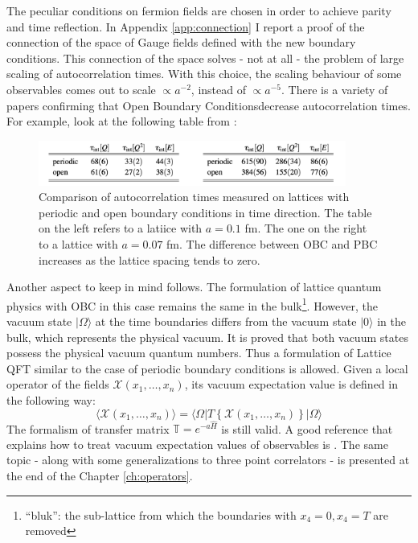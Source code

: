 \documentclass[english, LaM, oneside, noexaminfo]{sapthesis}
\newcommand{\la}{\langle}
\newcommand{\ra}{\rangle}
\newcommand{\obc}{Open Boundary Conditions}
\begin{document}
The peculiar conditions on fermion fields are chosen in order to achieve parity and time reflection.
In Appendix \ref{app:connection} I report a proof of the connection of the space of Gauge fields defined with the new boundary conditions.
This connection of the space solves - not at all - the problem of large scaling of autocorrelation times.
With this choice, the scaling behaviour of some observables comes out to scale $\propto a^{-2}$, instead of $\propto a^{-5}$.
There is a variety of papers confirming that \obc\space decrease autocorrelation times.
For example, look at the following table from \cite{Topology-WilsonFlow-HMC}:
\begin{figure}[h!]
    \centering
    \includegraphics[width=0.9\textwidth]{imgs-MSc-thesis/autocorrelation.png}
    \caption{Comparison of autocorrelation times measured on lattices with periodic and open boundary conditions in time direction.
    The table on the left refers to a latiice with $a=0.1$ fm. The one on the right to a lattice with $a=0.07$ fm. The difference between OBC and PBC increases as the lattice spacing tends to zero. \cite{Topology-WilsonFlow-HMC}}
    \label{tab:autocorrelation-times}
\end{figure}
\newline
Another aspect to keep in mind follows.
The formulation of lattice quantum physics with OBC in this case remains the same in the bulk\footnote{``bluk'': the sub-lattice from which the boundaries with $x_4 = 0, x_4 = T$ are removed}.
However, the vacuum state $|\Omega\ra$ at the time boundaries differs from the vacuum state $|0\ra$ in the bulk, which represents the physical vacuum.
It is proved \cite{OBC_top} that both vacuum states possess the physical vacuum quantum numbers.
Thus a formulation of Lattice QFT similar to the case of periodic boundary conditions is allowed.
Given a local operator of the fields $\mathcal{X}(x_1,\dots,x_n)$, its vacuum expectation value is defined in the following way:
\begin{equation*}
    \la \mathcal{X}(x_1,\dots,x_n) \ra = \la \Omega | T \left\{ \mathcal{X}(x_1,\dots,x_n) \right\} | \Omega \ra
\end{equation*}
The formalism of transfer matrix $\mathbb{T} = e^{-a\hat H}$ is still valid.
A good reference that explains how to treat vacuum expectation values of observables is \cite{ExtractionSpectralQuantities}.
The same topic - along with some generalizations to three point correlators - is presented at the end of the Chapter \ref{ch:operators}.
\end{document}

